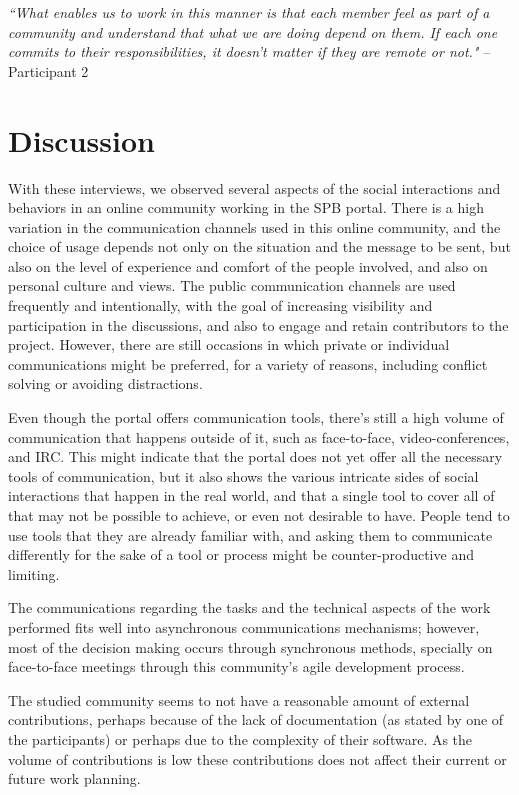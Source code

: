 \documentclass{sigchi}
\begin{document}
\begin{displayquote}
\textit{``What enables us to work in this manner is that each member feel as part of a community and understand that what we are doing depend on them. If each one commits to their responsibilities, it doesn't matter if they are remote or not."} – Participant 2
\end{displayquote}

\section{Discussion}

With these interviews, we observed several aspects of the social interactions and behaviors in an online community working in the SPB portal. There is a high variation in the communication channels used in this online community, and the choice of usage depends not only on the situation and the message to be sent, but also on the level of experience and comfort of the people involved, and also on personal culture and views. The public communication channels are used frequently and  intentionally, with the goal of increasing visibility and participation in the discussions, and also to engage and retain contributors to the project. However, there are still occasions in which private or individual communications might be preferred, for a variety of reasons, including conflict solving or avoiding distractions.

Even though the portal offers communication tools, there's still a high volume of communication that happens outside of it, such as face-to-face, video-conferences, and IRC. This might indicate that the portal does not yet offer all the necessary tools of communication, but it also shows the various intricate sides of social interactions that happen in the real world, and that a single tool to cover all of that may not be possible to achieve, or even not desirable to have. People tend to use tools that they are already familiar with, and asking them to communicate differently for the sake of a tool or process might be counter-productive and limiting.

The communications regarding the tasks and the technical aspects of the work performed fits well into asynchronous communications mechanisms; however, most of the decision making occurs through synchronous methods, specially on face-to-face meetings through this community's agile development process. 

The studied community seems to not have a reasonable amount of external contributions, perhaps because of the lack of documentation (as stated by one of the participants) or perhaps due to the complexity of their software. As the volume of contributions is low these contributions does not affect their current or future work planning.
\end{document}
